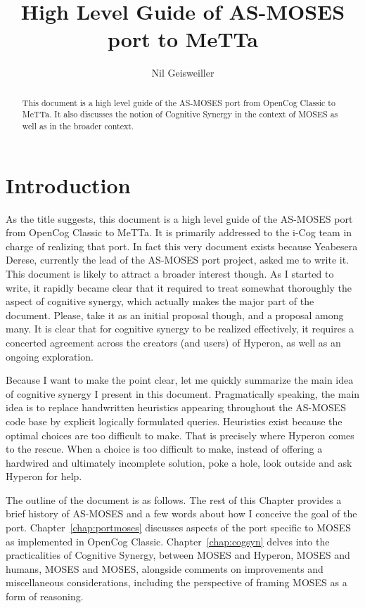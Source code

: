 \documentclass[]{report}
\begin{document}
\title{High Level Guide of AS-MOSES port to MeTTa}
\author{Nil Geisweiller}
\maketitle

\begin{abstract}
This document is a high level guide of the AS-MOSES port from OpenCog
Classic to MeTTa.  It also discusses the notion of Cognitive Synergy
in the context of MOSES as well as in the broader context.
\end{abstract}

\tableofcontents

\chapter{Introduction}

As the title suggests, this document is a high level guide of the
AS-MOSES port from OpenCog Classic to MeTTa.  It is primarily
addressed to the i-Cog team in charge of realizing that port.  In fact
this very document exists because Yeabesera Derese, currently the lead
of the AS-MOSES port project, asked me to write it.  This document is
likely to attract a broader interest though.  As I started to write,
it rapidly became clear that it required to treat somewhat thoroughly
the aspect of cognitive synergy, which actually makes the major part
of the document.  Please, take it as an initial proposal though, and a
proposal among many.  It is clear that for cognitive synergy to be
realized effectively, it requires a concerted agreement across the
creators (and users) of Hyperon, as well as an ongoing exploration.

Because I want to make the point clear, let me quickly summarize the
main idea of cognitive synergy I present in this document.
Pragmatically speaking, the main idea is to replace handwritten
heuristics appearing throughout the AS-MOSES code base by explicit
logically formulated queries.  Heuristics exist because the optimal
choices are too difficult to make.  That is precisely where Hyperon
comes to the rescue.  When a choice is too difficult to make, instead
of offering a hardwired and ultimately incomplete solution, poke a
hole, look outside and ask Hyperon for help.

The outline of the document is as follows.  The rest of this Chapter
provides a brief history of AS-MOSES and a few words about how I
conceive the goal of the port.  Chapter~\ref{chap:portmoses} discusses
aspects of the port specific to MOSES as implemented in OpenCog
Classic.  Chapter~\ref{chap:cogsyn} delves into the practicalities of
Cognitive Synergy, between MOSES and Hyperon, MOSES and humans, MOSES
and MOSES, alongside comments on improvements and miscellaneous
considerations, including the perspective of framing MOSES as a form
of reasoning.
\end{document}
